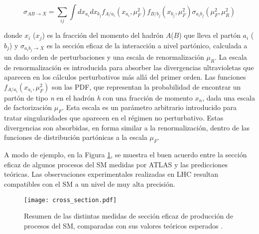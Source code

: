 \begin{equation}
\sigma_{AB\rightarrow X}=\sum_{ij}\int dx_{a_{i}}dx_{b_{j}}f_{A/a_{i}}(x_{a_{i}},\mu_{F}^{2})f_{B/b_{j}}(x_{b_{j}},\mu_{F}^{2})\sigma_{a_{i}b_{j}}(\mu_{F}^{2},\mu_{R}^{2})
\end{equation}

\noindent
donde $x_{i}$ ($x_{j}$) es la fracción del momento del hadrón $A$($B$) que lleva el partón $a_{i}$ ($b_{j}$) y $\sigma_{a_{i}b_{j}\rightarrow X}$ es la sección eficaz de la interacción a nivel partónico, calculada a un dado orden de perturbaciones y una escala de renormalización $\mu_R$. La escala de renormalización es introducida para absorber las divergencias ultravioletas que aparecen en los cálculos perturbativos más allá del primer orden. Las funciones $f_{A/a_{i}}(x_{a_{i}},\mu_{F}^{2})$ son las PDF, que representan la probabilidad de encontrar un partón de tipo \textit{n} en el hadrón \textit{h} con una fracción de momento $x_{n}$, dada una escala de factorización $\mu_{F}$. Esta escala es un parámetro arbitrario introducido para tratar singularidades que aparecen en el régimen no perturbativo. Estas divergencias son absorbidas, en forma similar a la renormalización, dentro de las funciones de distribución partónicas a la escala $\mu_{F}$. 


A modo de ejemplo, en la Figura \ref{cross_section}, se muestra el buen acuerdo entre la sección eficaz de algunos procesos del SM medidas por ATLAS y las predicciones teóricas. Las observaciones experimentales realizadas en LHC resultan compatibles con el SM a un nivel de muy alta precisión.


\begin{figure}[ht]
\centering
\texttt{[image: cross\_section.pdf]}
\caption{Resumen de las distintas medidas de sección eficaz de producción de procesos del SM, comparadas con sus valores teóricos esperados \cite{crosssect_web}.}
\label{cross_section}
\end{figure}


\clearpage